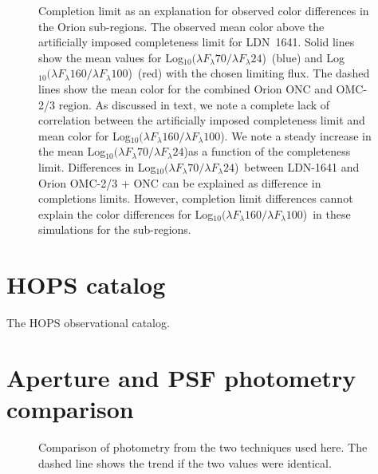 \documentclass[manuscript]{aastex61}
\newcommand{\clra}{Log$_{10}(\lambda F_\lambda70/\lambda F_\lambda24$)}
\newcommand{\clrb}{Log$_{10}(\lambda F_\lambda160/\lambda F_\lambda100$)}
\begin{document}
\begin{figure}[ht]
\centering
{}
\caption{Completion limit as an explanation for observed color differences in the Orion sub-regions.  The observed mean color above the artificially imposed completeness limit for LDN~1641.  Solid lines show the mean values for \clra\ (blue) and \clrb\ (red) with the chosen limiting flux.  The dashed lines show the mean color for the combined Orion ONC and OMC-2/3 region.  As discussed in text, we note a complete lack of correlation between the artificially imposed completeness limit and mean color for \clrb.  We note a steady increase in the mean \clra as a function of the completeness limit.  Differences in \clra\ between LDN-1641 and Orion OMC-2/3 + ONC can be explained as difference in completions limits.  However, completion limit differences cannot explain the color differences for \clrb\ in these simulations for the sub-regions.\label{fig:clr_v_limit}}
\end{figure}

\appendix

\section{HOPS catalog}
\par
The HOPS observational catalog.


\section{Aperture and PSF photometry comparison}
\begin{figure}[ht]
\centering
{}
\caption{Comparison of photometry from the two techniques used here. The dashed line shows the trend if the two values were identical.\label{fig:aper_psf_comp}}
\end{figure}
\end{document}
